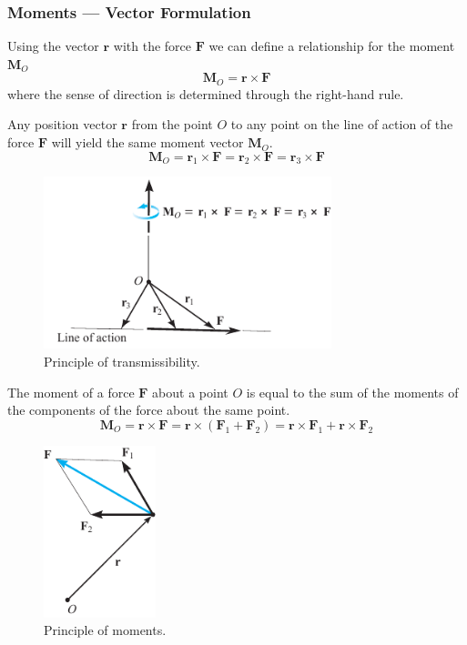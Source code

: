 \documentclass{article}
\begin{document}
\subsubsection{Moments --- Vector Formulation}
Using the vector \(\symbf{r}\) with the force \(\symbf{F}\) we can define a relationship for the moment \(\symbf{M}_O\)
\begin{equation*}
    \symbf{M}_O = \symbf{r} \times \symbf{F}
\end{equation*}
where the sense of direction is determined through the right-hand rule.
\begin{theorem}
    Any position vector \(\symbf{r}\) from the point \(O\) to any point on the line of action of the force \(\symbf{F}\)
    will yield the same moment vector \(\symbf{M}_O\).
    \begin{equation*}
        \symbf{M}_O = \symbf{r}_1 \times \symbf{F} = \symbf{r}_2 \times \symbf{F} = \symbf{r}_3 \times \symbf{F}
    \end{equation*}
    \begin{figure}[H]
        \centering
        \includegraphics[height = 5cm, keepaspectratio = true]{figures/principle_of_transmissibility.pdf}
        \caption{Principle of transmissibility.} %
    \end{figure}
\end{theorem}
\begin{theorem}
    The moment of a force \(\symbf{F}\) about a point \(O\) is equal to the sum of the
    moments of the components of the force about the same point.
    \begin{equation*}
        \symbf{M}_O = \symbf{r} \times \symbf{F} = \symbf{r} \times \left( \symbf{F}_1 + \symbf{F}_2 \right) = \symbf{r} \times \symbf{F}_1 + \symbf{r} \times \symbf{F}_2
    \end{equation*}
    \begin{figure}[H]
        \centering
        \includegraphics[height = 5cm, keepaspectratio = true]{figures/principle_of_moments.pdf}
        \caption{Principle of moments.} %
    \end{figure}
\end{theorem}
\end{document}
